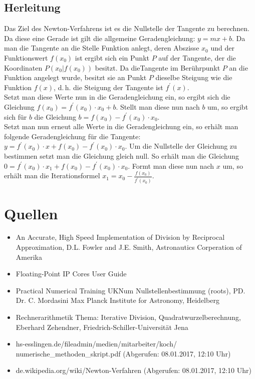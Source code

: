 \documentclass[a4paper,12pt,fleqn,oneside]{article}
\begin{document}
	\subsection{Herleitung}
		Das Ziel des Newton-Verfahrens ist es die Nullstelle der Tangente zu berechnen. Da diese eine Gerade ist gilt die allgemeine Geradengleichung:
		$y = mx + b$. Da man die Tangente an die Stelle Funktion anlegt, deren Abszisse $x_0$ und der Funktionswert $f(x_0)$ ist ergibt sich ein Punkt
		$P$ auf der Tangente, der die Koordinaten $P(x_0|f(x_0))$ besitzt. Da dieTangente im Berührpunkt $P$ an die Funktion angelegt wurde, besitzt
		sie an Punkt $P$ dieselbe Steigung wie die Funktion $f(x)$, d.\,h. die Steigung der Tangente ist $f^\prime(x)$.\\
		Setzt man diese Werte nun in die Geradengleichung ein, so ergibt sich die Gleichung $f(x_0) = f^\prime(x_0) \cdot x_0  + b$. Stellt man diese
		nun nach $b$ um, so ergibt sich für $b$ die Gleichung $b = f(x_0) - f^\prime(x_0) \cdot x_0$.\\
		Setzt man nun erneut alle Werte in die Geradengleichung ein, so erhält man folgende Geradengleichung für die Tangente:
		$y = f^\prime(x_0) \cdot x  + f(x_0) - f^\prime(x_0) \cdot x_0$. Um die Nullstelle der Gleichung zu bestimmen setzt man die Gleichung gleich
		null. So erhält man die Gleichung $0 = f^\prime(x_0) \cdot x_1  + f(x_0) - f^\prime(x_0) \cdot x_0$. Formt man diese nun nach $x$ um, so
		erhält man die Iterationsformel $x_1 =x_0 - \frac{f(x_0)}{f^\prime(x_0)}$.
		







\newpage

\section{Quellen}
	\begin{itemize}
		\item An Accurate, High Speed Implementation of Division by Reciprocal Approximation, D.L. Fowler and J.E. Smith, Astronautics Corperation of
			Amerika
		\item Floating-Point IP Cores User Guide
		\item Practical Numerical Training UKNum Nullstellenbestimmung (roots), PD. Dr. C. Mordasini Max Planck Institute for Astronomy, Heidelberg
		\item Rechnerarithmetik Thema: Iterative Division, Quadratwurzelberechnung, Eberhard Zehendner, Friedrich-Schiller-Universität Jena
		\item hs-esslingen.de/fileadmin/medien/mitarbeiter/koch/\\numerische\_methoden\_skript.pdf (Abgerufen: 08.01.2017, 12:10 Uhr)
		\item de.wikipedia.org/wiki/Newton-Verfahren (Abgerufen: 08.01.2017, 12:10 Uhr)
	\end{itemize}





	
\end{document}
